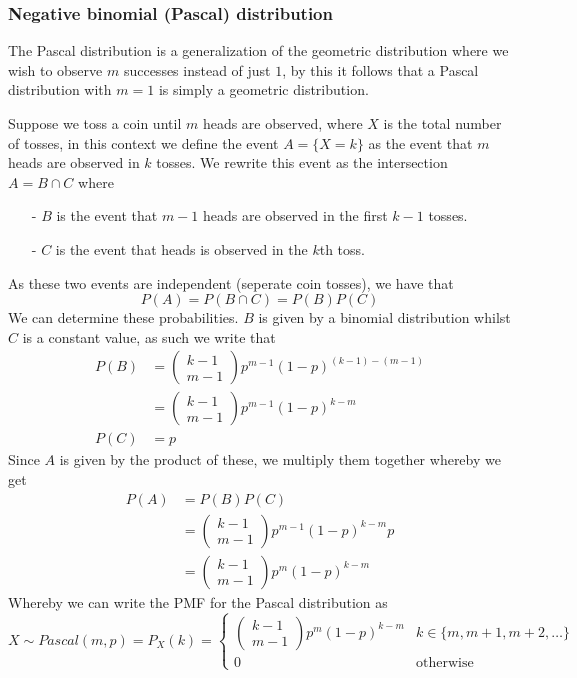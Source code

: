 \subsubsection{Negative binomial (Pascal) distribution}
The Pascal distribution is a generalization of the geometric distribution where we wish to observe $m$ successes instead of just $1$, by this it follows that a Pascal distribution with $m=1$ is simply a geometric distribution.

Suppose we toss a coin until $m$ heads are observed, where $X$ is the total number of tosses, in this context we define the event $A=\{X=k\}$ as the event that $m$ heads are observed in $k$ tosses. We rewrite this event as the intersection $A=B\cap C$ where
\begin{itemize}
    \item[-] $B$ is the event that $m-1$ heads are observed in the first $k-1$ tosses.
    \item[-] $C$ is the event that heads is observed in the $k$th toss.
\end{itemize}
As these two events are independent (seperate coin tosses), we have that
\[
    P(A)=P(B\cap C)=P(B)P(C)
\]
We can determine these probabilities. $B$ is given by a binomial distribution whilst $C$ is a constant value, as such we write that
\begin{align*}
    P(B)&=\begin{pmatrix}k-1\\m-1\end{pmatrix}p^{m-1}(1-p)^{(k-1)-(m-1)} \\
        &=\begin{pmatrix}k-1\\m-1\end{pmatrix}p^{m-1}(1-p)^{k-m} \\
    P(C)&=p
\end{align*}
Since $A$ is given by the product of these, we multiply them together whereby we get
\begin{align*}
    P(A)&=P(B)P(C) \\
        &=\begin{pmatrix}k-1\\m-1\end{pmatrix}p^{m-1}(1-p)^{k-m}p \\
        &=\begin{pmatrix}k-1\\m-1\end{pmatrix}p^{m}(1-p)^{k-m}
\end{align*}
Whereby we can write the PMF for the Pascal distribution as
\[
    X\sim Pascal(m,p)=P_{X}(k)=\begin{cases}\begin{pmatrix}k-1\\m-1\end{pmatrix}p^{m}(1-p)^{k-m} & k\in\{m,m+1,m+2,\ldots\} \\ 0 & \text{otherwise}\end{cases}
\]
